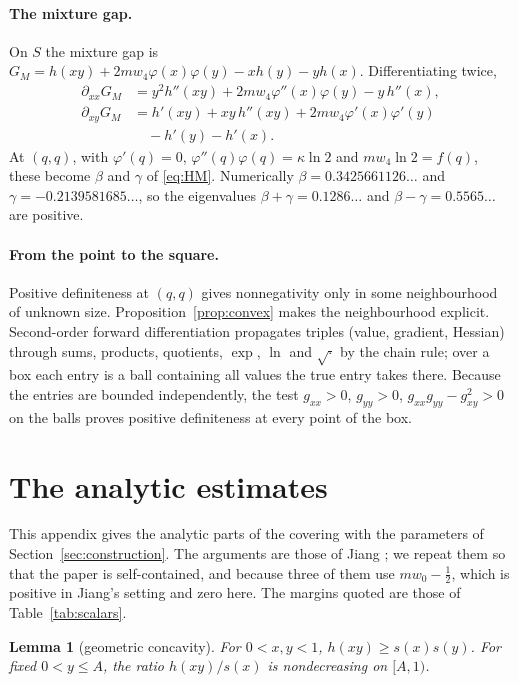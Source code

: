 \documentclass[aps,prd,twocolumn,superscriptaddress,nofootinbib,longbibliography,floatfix,amsmath,amssymb,10pt]{revtex4-2}
\theoremstyle{plain}
\newtheorem{lemma}[theorem]{Lemma}
\theoremstyle{definition}
\theoremstyle{plain}
\begin{document}
\paragraph*{The mixture gap.} On $S$ the mixture gap is $G_M=h(xy)+2mw_4\varphi(x)\varphi(y)-xh(y)-yh(x)$. Differentiating twice,
\begin{align*}
\partial_{xx}G_M&=y^2h''(xy)+2mw_4\varphi''(x)\varphi(y)-y\,h''(x),\\
\partial_{xy}G_M&=h'(xy)+xy\,h''(xy)+2mw_4\varphi'(x)\varphi'(y)\\&\quad-h'(y)-h'(x).
\end{align*}
At $(q,q)$, with $\varphi'(q)=0$, $\varphi''(q)\varphi(q)=\kappa\ln2$ and $mw_4\ln 2=f(q)$, these become $\beta$ and $\gamma$ of \eqref{eq:HM}. Numerically $\beta=0.3425661126\ldots$ and $\gamma=-0.2139581685\ldots$, so the eigenvalues $\beta+\gamma=0.1286\ldots$ and $\beta-\gamma=0.5565\ldots$ are positive.

\paragraph*{From the point to the square.} Positive definiteness at $(q,q)$ gives nonnegativity only in some neighbourhood of unknown size. Proposition~\ref{prop:convex} makes the neighbourhood explicit. Second-order forward differentiation propagates triples (value, gradient, Hessian) through sums, products, quotients, $\exp$, $\ln$ and $\sqrt{\cdot}$ by the chain rule; over a box each entry is a ball containing all values the true entry takes there. Because the entries are bounded independently, the test $g_{xx}>0$, $g_{yy}>0$, $g_{xx}g_{yy}-g_{xy}^2>0$ on the balls proves positive definiteness at every point of the box.

\section{The analytic estimates}\label{app:analytic}

This appendix gives the analytic parts of the covering with the parameters of Section~\ref{sec:construction}. The arguments are those of Jiang \cite[Sections~6--8]{Jia26}; we repeat them so that the paper is self-contained, and because three of them use $mw_0-\frac12$, which is positive in Jiang's setting and zero here. The margins quoted are those of Table~\ref{tab:scalars}.

\begin{lemma}[geometric concavity]\label{lem:geom}
For $0<x,y<1$, $h(xy)\ge s(x)s(y)$. For fixed $0<y\le A$, the ratio $h(xy)/s(x)$ is nondecreasing on $[A,1)$.
\end{lemma}
\end{document}
